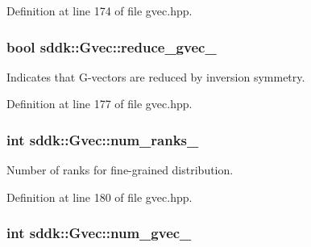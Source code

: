 Definition at line 174 of file gvec.\+hpp.

\hypertarget{classsddk_1_1_gvec_aba6399c3e2408cde1168fb5e72e82b15}{}
\subsubsection[{reduce\+\_\+gvec\+\_\+}]{\setlength{\rightskip}{0pt plus 5cm}bool sddk\+::\+Gvec\+::reduce\+\_\+gvec\+\_\+\hspace{0.3cm}{\ttfamily [private]}}\label{classsddk_1_1_gvec_aba6399c3e2408cde1168fb5e72e82b15}


Indicates that G-\/vectors are reduced by inversion symmetry. 



Definition at line 177 of file gvec.\+hpp.

\hypertarget{classsddk_1_1_gvec_a54ae64b74a7dcfe6f82f9516be4fbc64}{}
\subsubsection[{num\+\_\+ranks\+\_\+}]{\setlength{\rightskip}{0pt plus 5cm}int sddk\+::\+Gvec\+::num\+\_\+ranks\+\_\+\hspace{0.3cm}{\ttfamily [private]}}\label{classsddk_1_1_gvec_a54ae64b74a7dcfe6f82f9516be4fbc64}


Number of ranks for fine-\/grained distribution. 



Definition at line 180 of file gvec.\+hpp.

\hypertarget{classsddk_1_1_gvec_ad376b1d40e9241a3bdfd227b8ce487fa}{}
\subsubsection[{num\+\_\+gvec\+\_\+}]{\setlength{\rightskip}{0pt plus 5cm}int sddk\+::\+Gvec\+::num\+\_\+gvec\+\_\+\hspace{0.3cm}{\ttfamily [private]}}\label{classsddk_1_1_gvec_ad376b1d40e9241a3bdfd227b8ce487fa}


